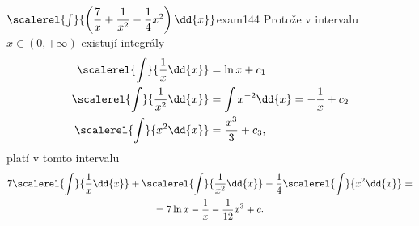 \begin{mathexam}{\(\scalerel{\int}{\left(\dfrac{7}{x}+ \dfrac{1}{x^2} -
    \dfrac{1}{4}x^2\right)\dd{x}}\)}{exam144} 
    Protože v intervalu \(x\in(0, +\infty)\) existují integrály
    \begin{align*}
      \scalerel{\int}{\dfrac{1}{x}\dd{x}}   &= \ln x + c_1  \\
      \scalerel{\int}{\dfrac{1}{x^2}\dd{x}} &= \int x^{-2}\dd{x} = -\dfrac{1}{x} + c_2  \\
      \scalerel{\int}{x^2\dd{x}}            &= \dfrac{x^3}{3} + c_3 ,
    \end{align*}  
    platí v tomto intervalu
    \begin{multline*}
                  7\scalerel{\int}{\dfrac{1}{x}\dd{x}}   + 
                   \scalerel{\int}{\dfrac{1}{x^2}\dd{x}} - 
       \dfrac{1}{4}\scalerel{\int}{x^2\dd{x}} =                   \\
      =7\ln x - \dfrac{1}{x} - \dfrac{1}{12}x^3 + c.
    \end{multline*}
\end{mathexam}
